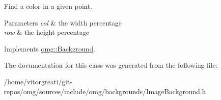 Find a color in a given point. 


\begin{DoxyParams}{Parameters}
{\em col} & the width percentage \\
\hline
{\em row} & the height percentage \\
\hline
\end{DoxyParams}


Implements \mbox{\hyperlink{classomg_1_1_background_a9f98d6bc2e213de258b5c3e45040b462}{omg\+::\+Background}}.



The documentation for this class was generated from the following file\+:\begin{DoxyCompactItemize}
\item 
/home/vitorgreati/git-\/repos/omg/sources/include/omg/backgrounds/Image\+Background.\+h\end{DoxyCompactItemize}
